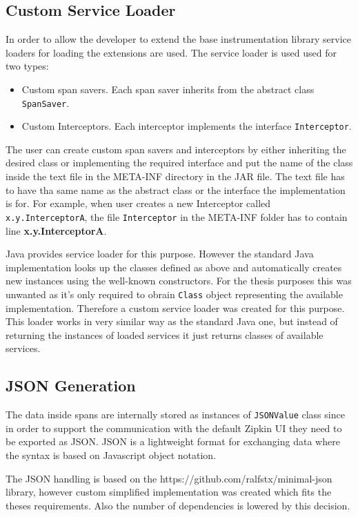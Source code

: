 \subsection{Custom Service Loader}
In order to allow the developer to extend the base instrumentation library service loaders for loading the extensions are used. The service loader is used used for two types: 
\begin{itemize}
	\item Custom span savers. Each span saver inherits from the abstract class \texttt{SpanSaver}.
	\item Custom Interceptors. Each interceptor implements the interface \texttt{Interceptor}.
\end{itemize} 
The user can create custom span savers and interceptors by either inheriting the desired class or implementing the required interface and put the name of the class inside the text file in the META-INF directory in the JAR file. The text file has to have tha same name as the abstract class or the interface the implementation is for. For example, when user creates a new Interceptor called \texttt{x.y.InterceptorA}, the file \texttt{Interceptor} in the META-INF folder has to contain line \textbf{x.y.InterceptorA}.

Java provides service loader for this purpose. However the standard Java implementation looks up the classes defined as above and automatically creates new instances using the well-known constructors. For the thesis purposes this was unwanted as it's only required to obrain \texttt{Class} object representing the available implementation. Therefore a custom service loader was created for this purpose. This loader works in very similar way as the standard Java one, but instead of returning the instances of loaded services it just returns classes of available services. 

\subsection{JSON Generation}
The data inside spans are internally stored as instances of \texttt{JSONValue} class since in order to support the communication with the default Zipkin UI they need to be exported as JSON. JSON is a lightweight format for exchanging data where the syntax is based on Javascript object notation.

The JSON handling is based on the https://github.com/ralfstx/minimal-json library, however custom simplified implementation was created which fits the theses requirements. Also the number of dependencies is lowered by this decision. 

